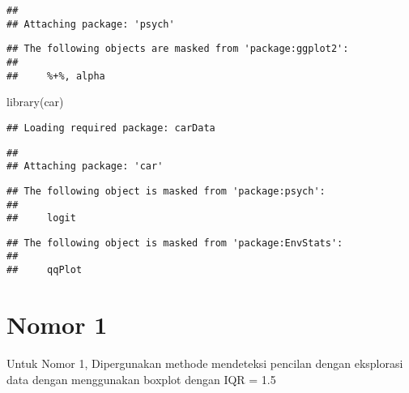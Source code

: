 \documentclass[
]{article}
\newenvironment{Shaded}{\begin{snugshade}}{\end{snugshade}}
\newcommand{\FunctionTok}[1]{\textcolor[rgb]{0.00,0.00,0.00}{#1}}
\newcommand{\NormalTok}[1]{#1}
\begin{document}
\begin{verbatim}
## 
## Attaching package: 'psych'
\end{verbatim}

\begin{verbatim}
## The following objects are masked from 'package:ggplot2':
## 
##     %+%, alpha
\end{verbatim}

\begin{Shaded}
\begin{Highlighting}[]
\FunctionTok{library}\NormalTok{(car)}
\end{Highlighting}
\end{Shaded}

\begin{verbatim}
## Loading required package: carData
\end{verbatim}

\begin{verbatim}
## 
## Attaching package: 'car'
\end{verbatim}

\begin{verbatim}
## The following object is masked from 'package:psych':
## 
##     logit
\end{verbatim}

\begin{verbatim}
## The following object is masked from 'package:EnvStats':
## 
##     qqPlot
\end{verbatim}

\hypertarget{nomor-1}{%
\section{Nomor 1}\label{nomor-1}}

Untuk Nomor 1, Dipergunakan methode mendeteksi pencilan dengan
eksplorasi data dengan menggunakan boxplot dengan IQR = 1.5
\end{document}
